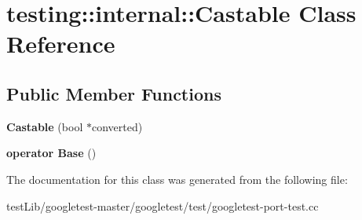 \hypertarget{classtesting_1_1internal_1_1Castable}{}\section{testing\+:\+:internal\+:\+:Castable Class Reference}
\label{classtesting_1_1internal_1_1Castable}
\subsection*{Public Member Functions}
\begin{DoxyCompactItemize}
\item 
\mbox{\label{classtesting_1_1internal_1_1Castable_a705d519a227d38ff5c174905316f62c4}} 
{\bfseries Castable} (bool $\ast$converted)
\item 
\mbox{\label{classtesting_1_1internal_1_1Castable_ac60b2e7885f3b09defb829eddaa0afd9}} 
{\bfseries operator Base} ()
\end{DoxyCompactItemize}


The documentation for this class was generated from the following file\+:\begin{DoxyCompactItemize}
\item 
test\+Lib/googletest-\/master/googletest/test/googletest-\/port-\/test.\+cc\end{DoxyCompactItemize}
